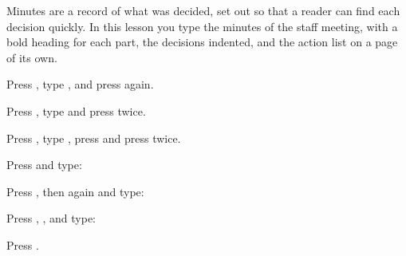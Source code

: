 Minutes are a record of what was decided, set out so that a reader can find
each decision quickly.  In this lesson you type the minutes of the staff
meeting, with a bold heading for each part, the decisions indented, and the
action list on a page of its own.

\newcommand\ActionLine[4]{\Typing{#1}\Keys{#2}\Typing{#4}\Keys{Enter}%
  \noindent\hspace*{4mm}\makebox[42mm][l]{\textbf{#1}}\makebox[18mm][l]{\textit{#3}}\textbf{#4}\par}
\begin{WPSteps}
\item Press , type ,
and press  again.
\item Press , type  and press
 twice.
\end{WPSteps}

\begin{WPSteps}
\item Press , type , press
 and press  twice.
\item Press  and type:
\item Press , then  again and type:
\item Press , , and type:
\item Press .
\end{WPSteps}

